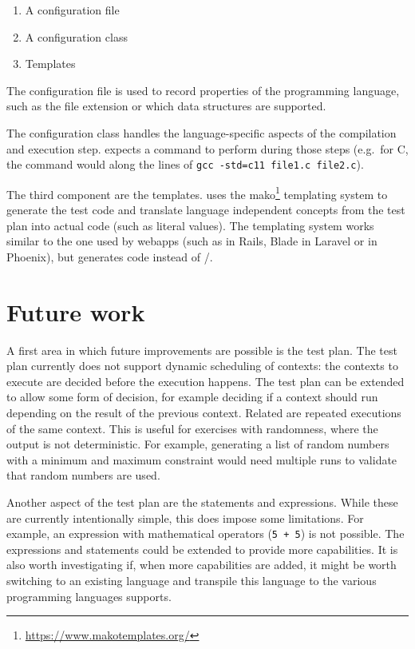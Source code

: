 \documentclass[5p,number]{elsarticle}
\begin{document}
    \begin{enumerate}
        \item A configuration file
        \item A configuration class
        \item Templates
    \end{enumerate}

    The configuration file is used to record properties of the programming language, such as the file extension or which data structures are supported.

    The configuration class handles the language-specific aspects of the compilation and execution step.
    \tested{} expects a command to perform during those steps (e.g.\ for C, the command would along the lines of \texttt{gcc -std=c11 file1.c file2.c}).

    The third component are the templates.
    \tested{} uses the mako\footnote{\url{https://www.makotemplates.org/}} templating system to generate the test code and translate language independent concepts from the test plan into actual code (such as literal values).
    The templating system works similar to the one used by webapps (such as  in Rails, Blade in Laravel or  in Phoenix), but generates code instead of /.
    
    \section{Future work}\label{sec:future-work}
    
    A first area in which future improvements are possible is the test plan.
    The test plan currently does not support dynamic scheduling of contexts: the contexts to execute are decided before the execution happens.
    The test plan can be extended to allow some form of decision, for example deciding if a context should run depending on the result of the previous context.
    Related are repeated executions of the same context.
    This is useful for exercises with randomness, where the output is not deterministic.
    For example, generating a list of random numbers with a minimum and maximum constraint would need multiple runs to validate that random numbers are used.
    
    Another aspect of the test plan are the statements and expressions.
    While these are currently intentionally simple, this does impose some limitations.
    For example, an expression with mathematical operators (\texttt{5 + 5}) is not possible.
    The expressions and statements could be extended to provide more capabilities.
    It is also worth investigating if, when more capabilities are added, it might be worth switching to an existing language and transpile this language to the various programming languages \tested{} supports.
    
\end{document}
